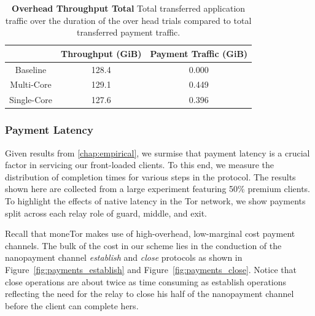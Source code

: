 \begin{table}
  \caption[Overhead Throughput Total]{\textbf{Overhead Throughput Total} Total
    transferred application traffic over the duration of the over head trials
    compared to total transferred payment traffic.}
  \begin{center}
    \begin{tabular}{ c c c }
      & Throughput (GiB) & Payment Traffic (GiB) \\ \hline
      Baseline & 128.4 & 0.000 \\
      Multi-Core & 129.1 & 0.449 \\
      Single-Core & 127.6 & 0.396
    \end{tabular}
  \end{center}
  \label{tab:overhead}
\end{table}

\subsubsection{Payment Latency}

Given results from \autoref{chap:empirical}, we surmise that payment
latency is a crucial factor in servicing our front-loaded clients. To this end,
we measure the distribution of completion times for various steps in the
protocol. The results shown here are collected from a large experiment featuring
50\% premium clients. To highlight the effects of native latency in the Tor
network, we show payments split across each relay role of guard, middle, and
exit.

Recall that moneTor makes use of high-overhead, low-marginal cost payment
channels. The bulk of the cost in our scheme lies in the conduction of the
nanopayment channel \emph{establish} and \emph{close} protocols as shown in
Figure~\ref{fig:payments_establish} and Figure~\ref{fig:payments_close}. Notice
that close operations are about twice as time consuming as establish operations
reflecting the need for the relay to close his half of the nanopayment channel
before the client can complete hers.

